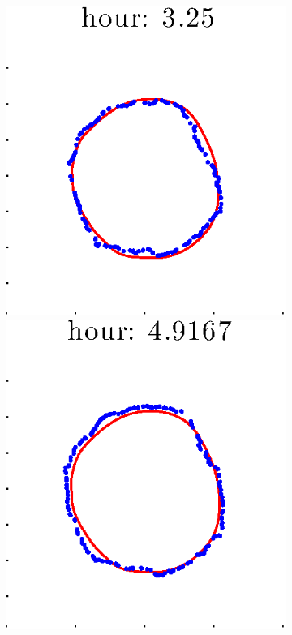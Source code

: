 \documentclass[12pt]{article}
\begin{document}
\begin{figure}[h!]
\begin{subfigure}[b]{.3\textwidth}
		\includegraphics[height=.15\textheight]{Pos0/full/second3.eps}
		\includegraphics[height=.15\textheight]{Pos0/full/second4.eps}

\end{subfigure}
\end{figure}
\end{document}
